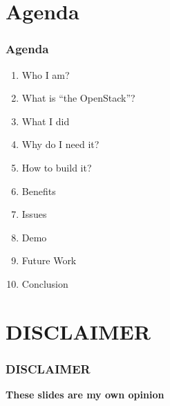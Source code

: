 \documentclass[aspectratio=169,11pt,hyperref={colorlinks=true}]{beamer}
\begin{document}
\section{Agenda}
\begin{frame}
  \frametitle{Agenda}
  \begin{enumerate}
    \item Who I am?
    \item What is ``the OpenStack''?
    \item What I did
    \item Why do I need it?
    \item How to build it?
    \item Benefits
    \item Issues
    \item Demo
    \item Future Work
    \item Conclusion
  \end{enumerate}
\end{frame}

\section{DISCLAIMER}
\begin{frame}
  \frametitle{DISCLAIMER}
  \Huge{\bf{These slides are my own opinion}}
\end{frame}
\end{document}
